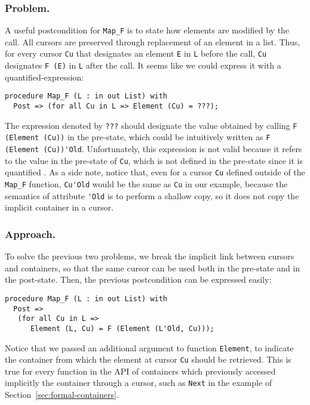 \documentclass[runningheads,a4paper]{llncs}
\begin{document}
\subsubsection{Problem.}

A useful postcondition for \verb|Map_F| is to state how elements are
modified by the call. All cursors are preserved through replacement of an
element in a list. Thus, for every cursor \verb|Cu| that designates an element
\verb|E| in \verb|L| before the call, \verb|Cu| designates \verb|F (E)| in
\verb|L| after the call. It seems like we could express it with a
quantified-expression:
\begin{lstlisting}
procedure Map_F (L : in out List) with 
  Post => (for all Cu in L => Element (Cu) = ???);
\end{lstlisting}

The expression denoted by \verb|???| should designate the value obtained by calling
\verb|F (Element (Cu))| in the pre-state, which could be intuitively written as
\verb|F (Element (Cu))'Old|. Unfortunately, this expression is not valid
because it refers to the value in the pre-state of \verb|Cu|, which is not
defined in the pre-state
since it is quantified
%
. As a side note, notice that, even for a cursor
\verb|Cu| defined outside of the \verb|Map_F| function, \verb|Cu'Old| would be the same as
\verb|Cu| in our example, because the semantics of attribute \verb|'Old| is to
perform a shallow copy, so it does not copy the implicit container in a cursor.


\subsubsection{Approach.}
To solve the previous two problems,
we break the implicit link between cursors and containers, so that the same cursor can be used both in
the pre-state and in the post-state. Then, the previous postcondition can be
expressed easily:
\begin{lstlisting}
procedure Map_F (L : in out List) with 
  Post => 
   (for all Cu in L =>
      Element (L, Cu) = F (Element (L'Old, Cu)));
\end{lstlisting}

Notice that we passed an additional argument to function \verb|Element|, to
indicate the container from which the element at cursor \verb|Cu| should be
retrieved. This is true for every function in the API of containers which
previously accessed implicitly the container through a cursor, such as 
\verb|Next| in the example of Section~\ref{sec:formal-containers}.
\end{document}
